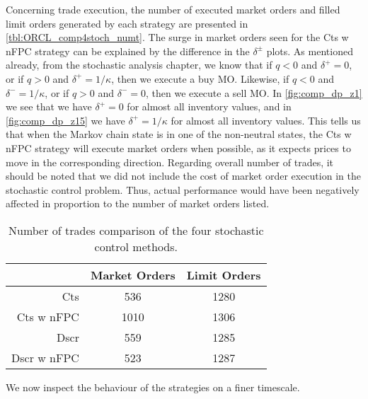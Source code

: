 Concerning trade execution, the number of executed market orders and filled limit orders generated by each strategy are presented in \autoref{tbl:ORCL_comp4stoch_numt}. The surge in market orders seen for the Cts w nFPC strategy can be explained by the difference in the $\delta^\pm$ plots. As mentioned already, from the stochastic analysis chapter, we know that if $q < 0 $ and $\delta^+ =0$, or if $q > 0$ and $\delta^+ = 1/\kappa$, then we execute a buy MO. Likewise, if $q < 0 $ and $\delta^- =1/\kappa$, or if $q > 0$ and $\delta^- = 0$, then we execute a sell MO. In \autoref{fig:comp_dp_z1} we see that we have $\delta^+ = 0$ for almost all inventory values, and in \autoref{fig:comp_dp_z15} we have  $\delta^+ = 1/\kappa$ for almost all inventory values. This tells us that when the Markov chain state is in one of the non-neutral states, the Cts w nFPC strategy will execute market orders when possible, as it expects prices to move in the corresponding direction. Regarding overall number of trades, it should be noted that we did not include the cost of market order execution in the stochastic control problem. Thus, actual performance would have been negatively affected in proportion to the number of market orders listed.
\begin{table}
\centering
{}
\begin{tabular}{@{} r *{2}{c} @{}}
\toprule
& Market Orders & Limit Orders \\
\midrule
Cts          &  536 & 1280 \\
Cts w nFPC   & 1010 & 1306 \\
Dscr         &  559 & 1285 \\
Dscr w nFPC  &  523 & 1287 \\
\bottomrule
\end{tabular}
\caption{Number of trades comparison of the four stochastic control methods.}
\label{tbl:ORCL_comp4stoch_numt}
\end{table}

We now inspect the behaviour of the strategies on a finer timescale. 

